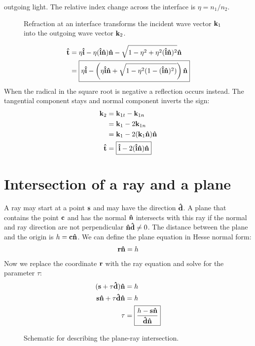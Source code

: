 outgoing light. The relative index change across the interface is
$\eta=n_1/n_2$.
\begin{figure}
  \centering
  
  \caption{Refraction at an interface transforms the incident wave
    vector $\mathbf{k}_1$ into the outgoing wave vector $\mathbf{k}_2$.}
\end{figure}
\begin{align}
  \mathbf{\hat{t}}&=\eta\mathbf{\hat{i}}-\eta(\mathbf{\hat{i}}\mathbf{\hat{n}})\mathbf{\hat{n}}-\sqrt{1-\eta^2+\eta^2(\mathbf{\hat{i}}\mathbf{\hat{n}})^2}\mathbf{\hat{n}}\\
  &=\boxed{\eta\mathbf{\hat{i}}-\left(\eta\mathbf{\hat{i}}\mathbf{\hat{n}}+\sqrt{1-\eta^2(1-(\mathbf{\hat{i}}\mathbf{\hat{n}})^2)}\right)\mathbf{\hat{n}}}
\end{align}
 When the radical in the square root is negative a reflection occurs
 instead. The tangential component stays and normal component inverts
 the sign:
 \begin{align}
   \mathbf{k}_2&=\mathbf{k}_{1t}-\mathbf{k}_{1n}\\
   &=\mathbf{k}_1 - 2\mathbf{k}_{1n}\\
   &=\mathbf{k}_1-2(\mathbf{k}_1\mathbf{\hat{n}})\mathbf{\hat{n}}\\
   \mathbf{\hat{t}}&=\boxed{\mathbf{\hat{i}}-2(\mathbf{\hat{i}}\mathbf{\hat{n}})\mathbf{\hat{n}}}
 \end{align}
\section{Intersection of a ray and a plane}
A ray may start at a point $\mathbf{s}$ and may have the direction $\mathbf{\hat{d}}$.  A
plane that contains the point $\mathbf{c}$ and has the normal $\mathbf{\hat{n}}$ intersects
with this ray if the normal and ray direction are not perpendicular
$\mathbf{\hat{n}}\mathbf{\hat{d}}\not=0$. The distance between the plane and the origin is
$h=\mathbf{c}\mathbf{\hat{n}}$. We can define the plane equation in Hesse normal form:  
\begin{align}
  \mathbf{r}\mathbf{\hat{n}}=h
\end{align}
Now we replace the coordinate $\mathbf{r}$ with the ray equation and solve for
the parameter $\tau$:
\begin{align}
  (\mathbf{s}+\tau\mathbf{\hat{d}})\mathbf{\hat{n}}&=h\\
  \mathbf{s}\mathbf{\hat{n}}+\tau\mathbf{\hat{d}}\mathbf{\hat{n}}&=h\\
  \tau&=\boxed{\frac{h-\mathbf{s}\mathbf{\hat{n}}}{\mathbf{\hat{d}}\mathbf{\hat{n}}}}
\end{align}
 \begin{figure}[!hbt]
   \centering
   
   \caption{Schematic for describing the plane-ray intersection.}
 \end{figure}
